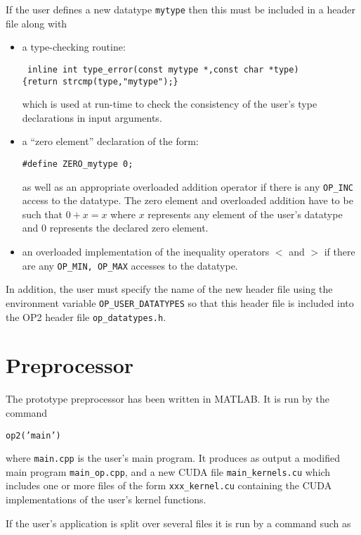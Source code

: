 \documentclass[11pt]{article}
\begin{document}
If the user defines a new datatype {\tt mytype} then this must be included in
a header file along with
\begin{itemize}
\item
a type-checking routine:

{\tt 
inline int type\_error(const mytype *,const char *type)\\
\{return strcmp(type,"mytype");\}
}

which is used at run-time to check the consistency of the user's type declarations
in input arguments.

\item

a ``zero element'' declaration of the form:

{\tt \#define ZERO\_mytype    0;}

as well as an appropriate overloaded addition operator  if there is any 
{\tt OP\_INC} access to the datatype.  The zero element and overloaded 
addition have to be such that $0 + x = x$ where $x$ represents any element 
of the user's datatype and $0$ represents the declared zero element.

\item

an overloaded implementation of the inequality operators $<$ and $>$ 
if there are any {\tt OP\_MIN, OP\_MAX} accesses to the datatype.

\end{itemize}

In addition, the user must specify the name of the new header file using the 
environment variable {\tt OP\_USER\_DATATYPES}
so that this header file is included into the OP2 header file {\tt op\_datatypes.h}.


\newpage


\section{Preprocessor}

The prototype preprocessor has been written in MATLAB.  It is run by the command

{\tt op2('main')}

\noindent
where {\tt main.cpp} is the user's main program.  It produces as output a 
modified main program {\tt main\_op.cpp}, and a new CUDA file {\tt main\_kernels.cu}
which includes one or more files of the form {\tt xxx\_kernel.cu} containing 
the CUDA implementations of the user's kernel functions.

If the user's application is split over several files it is run by a command such as
\end{document}
